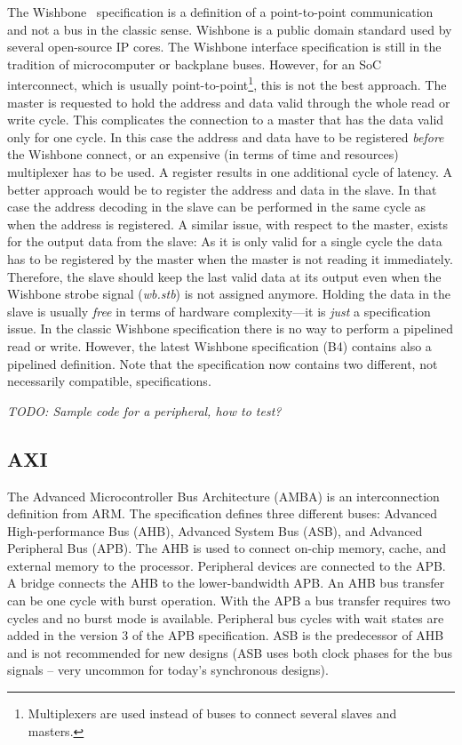 \documentclass[%
    10pt,
    headinclude, footexclude,
    openright, %
    notitlepage,
    cleardoubleempty,
    headsepline,
    pointlessnumbers,
    bibtotoc, idxtotoc,
    ]{scrbook}
\newcommand{\todo}[1]{{\emph{TODO: #1}}}
\begin{document}
The Wishbone~\cite{soc:wishbone} specification is a definition of
a point-to-point communication and not a bus in the classic sense.
Wishbone is a public domain standard used by
several open-source IP cores. The Wishbone interface specification
is still in the tradition of microcomputer or backplane buses.
However, for an SoC interconnect, which is usually
point-to-point\footnote{Multiplexers are used instead of buses to
connect several slaves and masters.}, this is not the best approach.
The master is requested to hold the address and data valid through
the whole read or write cycle. This complicates the connection to a
master that has the data valid only for one cycle. In this case the
address and data have to be registered \emph{before} the Wishbone
connect, or an expensive (in terms of time and resources) multiplexer has to be
used. A register results in one additional cycle of latency. A better
approach would be to register the address and data in the slave. In
that case the address decoding in the slave can be performed in the
same cycle as when the address is registered. A similar issue, with
respect to the master, exists for the output data from the slave: As
it is only valid for a single cycle the data has to be registered by
the master when the master is not reading it immediately. Therefore,
the slave should keep the last valid data at its output even when
the Wishbone strobe signal (\emph{wb.stb}) is not assigned anymore.
Holding the data in the slave is usually \emph{free} in terms of
hardware complexity---it is \emph{just} a specification issue. In
the classic Wishbone specification there is no way to perform a pipelined read
or write. However, the latest Wishbone specification (B4) contains
also a pipelined definition. Note that the specification now contains two
different, not necessarily compatible, specifications.

\todo{Sample code for a peripheral, how to test?}

\subsection{AXI}

The Advanced Microcontroller Bus Architecture (AMBA) \cite{soc:amba}
is an interconnection definition from ARM. The specification
defines three different buses: Advanced High-performance Bus (AHB),
Advanced System Bus (ASB), and Advanced Peripheral Bus (APB). The
AHB is used to connect on-chip memory, cache, and external memory to
the processor. Peripheral devices are connected to the APB. A bridge
connects the AHB to the lower-bandwidth APB. An AHB bus transfer can
be one cycle with burst operation. With the APB a bus transfer
requires two cycles and no burst mode is available. Peripheral bus
cycles with wait states are added in the version 3 of the APB
specification. ASB is the predecessor of AHB and is not recommended
for new designs (ASB uses both clock phases for the bus signals --
very uncommon for today's synchronous designs).
\end{document}
